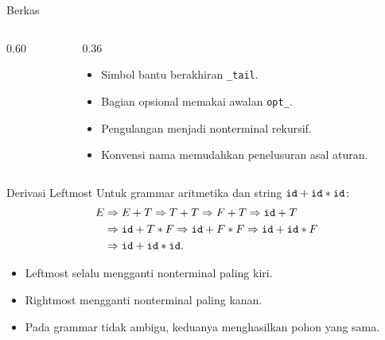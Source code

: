 \documentclass[aspectratio=169,10pt,t]{beamer}
\begin{document}
\begin{frame}[fragile]{Berkas }
  \begin{columns}[T,onlytextwidth]
    \begin{column}{0.60\textwidth}
      
    \end{column}
    \begin{column}{0.36\textwidth}
      \begin{itemize}
        \item Simbol bantu berakhiran \texttt{\_tail}.
        \item Bagian opsional memakai awalan \texttt{opt\_}.
        \item Pengulangan menjadi nonterminal rekursif.
        \item Konvensi nama memudahkan penelusuran asal aturan.
      \end{itemize}
    \end{column}
  \end{columns}
\end{frame}

\begin{frame}{Derivasi Leftmost}
  \small
  Untuk grammar aritmetika dan string
  \(\texttt{id}+\texttt{id}*\texttt{id}\):
  \[
  \begin{aligned}
    E &\Rightarrow E+T
      \Rightarrow T+T
      \Rightarrow F+T
      \Rightarrow \texttt{id}+T\\
    &\Rightarrow \texttt{id}+T*F
      \Rightarrow \texttt{id}+F*F
      \Rightarrow \texttt{id}+\texttt{id}*F\\
    &\Rightarrow \texttt{id}+\texttt{id}*\texttt{id}.
  \end{aligned}
  \]

  \vspace{4pt}
  \begin{itemize}
    \item Leftmost selalu mengganti nonterminal paling kiri.
    \item Rightmost mengganti nonterminal paling kanan.
    \item Pada grammar tidak ambigu, keduanya menghasilkan pohon yang
          sama.
  \end{itemize}
\end{frame}
\end{document}
